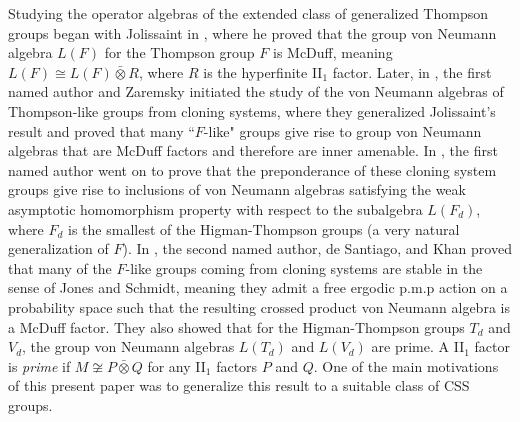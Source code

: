 \documentclass[12pt]{amsart}
\numberwithin{equation}{subsection}
\theoremstyle{definition}
\theoremstyle{definition}
\theoremstyle{remark}
\begin{document}
Studying the operator algebras of the extended class of generalized Thompson groups began with Jolissaint in \cite{jolissaint1998central}, where he proved that the group von Neumann algebra $L(F)$ for the Thompson group $F$ is McDuff, meaning $L(F) \cong L(F) \bar \otimes R$, where $R$ is the hyperfinite II$_1$ factor. Later, in  \cite{bashwinger2021neumann}, the first named author and Zaremsky initiated the study of the von Neumann algebras of Thompson-like groups from cloning systems, where they generalized Jolissaint's result and proved that many ``$F$-like" groups give rise to group von Neumann algebras that are McDuff factors and therefore are inner amenable. In \cite{bashwinger2023neumann}, the first named author went on to prove that the preponderance of these cloning system groups give rise to inclusions of von Neumann algebras satisfying the weak asymptotic homomorphism property with respect to the subalgebra $L(F_d)$, where $F_d$ is the smallest of the Higman-Thompson groups (a very natural generalization of $F$). In \cite{de2023mcduff}, the second named author, de Santiago, and Khan proved that many of the $F$-like groups coming from cloning systems are stable in the sense of Jones and Schmidt, meaning they admit a free ergodic p.m.p action on a probability space such that the resulting crossed product von Neumann algebra is a McDuff factor. They also showed that for the Higman-Thompson groups $T_d$ and $V_d$, the group von Neumann algebras $L(T_d)$ and $L(V_d)$ are prime. A II$_1$ factor is \emph{prime} if $M \not \cong P \bar \otimes Q $ for any II$_1$ factors $P$ and $Q$. One of the main motivations of this present paper was to generalize this result to a suitable class of CSS groups.
\end{document}
